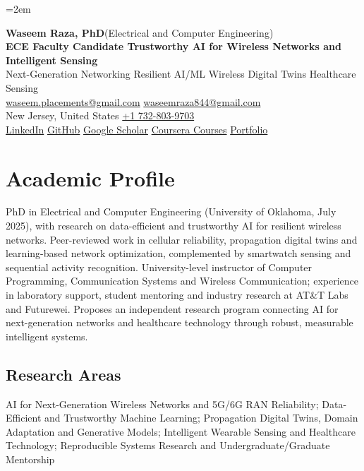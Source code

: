 \documentclass[8pt,letterpaper]{extarticle}
\begin{document}
\emergencystretch=2em
\begin{center}
{\LARGE\bfseries Waseem Raza, PhD}{\normalsize\mdseries \enspace (Electrical and Computer Engineering)}\\[2pt]
{\large\bfseries ECE Faculty Candidate \textbar{} Trustworthy AI for Wireless Networks and Intelligent Sensing}\\[1pt]
{\small Next-Generation Networking \textbar{} Resilient AI/ML \textbar{} Wireless Digital Twins \textbar{} Healthcare Sensing}\\[3pt]
{\footnotesize {}\enspace \href{mailto:waseem.placements@gmail.com}{waseem.placements@gmail.com} \textbar{} \href{mailto:waseemraza844@gmail.com}{waseemraza844@gmail.com}\\[1pt]New Jersey, United States \quad {}\enspace \href{tel:+17328039703}{+1 732-803-9703}\\[1pt]\href{https://www.linkedin.com/in/waseem-raza-phd-9a737858/}{LinkedIn} \textbar{} \href{https://github.com/WaseemRaza844}{GitHub} \textbar{} \href{https://scholar.google.com/citations?user=d58Drr0AAAAJ\&hl=en}{Google Scholar} \textbar{} \href{https://waseemraza844.github.io/portfolio/learning.html}{Coursera Courses} \textbar{} \href{https://waseemraza844.github.io/portfolio/}{Portfolio}}
\end{center}
\vspace{-5pt}
\section{Academic Profile}
PhD in Electrical and Computer Engineering (University of Oklahoma, July 2025), with research on data-efficient and trustworthy AI for resilient wireless networks. Peer-reviewed work in cellular reliability, propagation digital twins and learning-based network optimization, complemented by smartwatch sensing and sequential activity recognition. University-level instructor of Computer Programming, Communication Systems and Wireless Communication; experience in laboratory support, student mentoring and industry research at AT\&T Labs and Futurewei. Proposes an independent research program connecting AI for next-generation networks and healthcare technology through robust, measurable intelligent systems.
\subsection{Research Areas}
AI for Next-Generation Wireless Networks and 5G/6G RAN Reliability; Data-Efficient and Trustworthy Machine Learning; Propagation Digital Twins, Domain Adaptation and Generative Models; Intelligent Wearable Sensing and Healthcare Technology; Reproducible Systems Research and Undergraduate/Graduate Mentorship\par
{}
\end{document}
